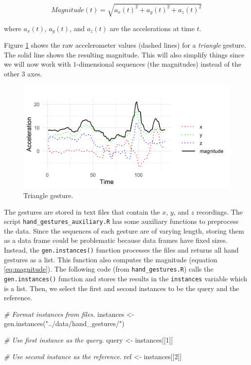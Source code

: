 \documentclass[
  11pt,
]{krantz}
\newenvironment{Shaded}{\begin{snugshade}}{\end{snugshade}}
\newcommand{\CommentTok}[1]{\textcolor[rgb]{0.37,0.37,0.37}{\textit{#1}}}
\newcommand{\DecValTok}[1]{\textcolor[rgb]{0.06,0.06,0.06}{#1}}
\newcommand{\FunctionTok}[1]{\textcolor[rgb]{0,0,0}{#1}}
\newcommand{\NormalTok}[1]{#1}
\newcommand{\OtherTok}[1]{\textcolor[rgb]{0.37,0.37,0.37}{#1}}
\newcommand{\StringTok}[1]{\textcolor[rgb]{0.5,0.5,0.5}{#1}}
\begin{document}
\begin{equation}
Magnitude(t) = \sqrt {{a_x}{{(t)}^2} + {a_y}{{(t)}^2} + {a_z}{{(t)}^2}}
\label{eq:magnitude}
\end{equation}

where \({a_x}{{(t)}}\), \({a_y}{{(t)}}\), and \({a_z}{{(t)}}\) are the accelerations at time \(t\).

Figure \ref{fig:handGestureMagnitude} shows the raw accelerometer values (dashed lines) for a \emph{triangle} gesture. The solid line shows the resulting magnitude. This will also simplify things since we will now work with \(1\)-dimensional sequences (the magnitudes) instead of the other \(3\) axes.

\begin{figure}

{\centering \includegraphics[width=0.9\linewidth]{images/triangle_xyzmagnitude} 

}

\caption{Triangle gesture.}\label{fig:handGestureMagnitude}
\end{figure}

The gestures are stored in text files that contain the \(x\), \(y\), and \(z\) recordings. The script \texttt{hand\_gestures\_auxiliary.R} has some auxiliary functions to preprocess the data. Since the sequences of each gesture are of varying length, storing them as a data frame could be problematic because data frames have fixed sizes. Instead, the \texttt{gen.instances()} function processes the files and returns all hand gestures as a list. This function also computes the magnitude (equation \eqref{eq:magnitude}). The following code (from \texttt{hand\_gestures.R}) calls the \texttt{gen.instances()} function and stores the results in the \texttt{instances} variable which is a list. Then, we select the first and second instances to be the query and the reference.

\begin{Shaded}
\begin{Highlighting}[]
\CommentTok{\# Format instances from files.}
\NormalTok{instances }\OtherTok{\textless{}{-}} \FunctionTok{gen.instances}\NormalTok{(}\StringTok{"../data/hand\_gestures/"}\NormalTok{)}

\CommentTok{\# Use first instance as the query.}
\NormalTok{query }\OtherTok{\textless{}{-}}\NormalTok{ instances[[}\DecValTok{1}\NormalTok{]]}

\CommentTok{\# Use second instance as the reference.}
\NormalTok{ref }\OtherTok{\textless{}{-}}\NormalTok{ instances[[}\DecValTok{2}\NormalTok{]]}
\end{Highlighting}
\end{Shaded}
\end{document}
